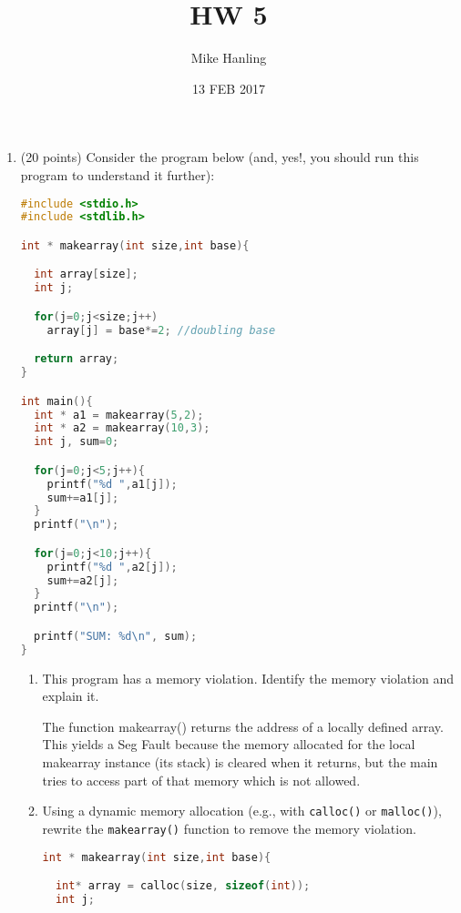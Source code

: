 \documentclass{article}[9pt]
\title{HW 5}
\author{Mike Hanling}
\date{13 FEB 2017}
\newenvironment{answerfont}{\fontfamily{qhv}\selectfont}{\par}
\newenvironment{myanswer}{\begin{mdframed}\begin{answerfont}}{\end{answerfont}\end{mdframed}}
\begin{document}
\maketitle


\begin{enumerate}
\item (20 points) Consider the program below (and, yes!, you should run this program to
understand it further):

\begin{lstlisting}[language=c]
#include <stdio.h>
#include <stdlib.h>

int * makearray(int size,int base){

  int array[size];
  int j;

  for(j=0;j<size;j++)
    array[j] = base*=2; //doubling base

  return array;
}

int main(){
  int * a1 = makearray(5,2);
  int * a2 = makearray(10,3);
  int j, sum=0;

  for(j=0;j<5;j++){
    printf("%d ",a1[j]);
    sum+=a1[j];
  }
  printf("\n");

  for(j=0;j<10;j++){
    printf("%d ",a2[j]);
    sum+=a2[j];
  }
  printf("\n");

  printf("SUM: %d\n", sum);
}
\end{lstlisting}


\begin{enumerate}
\item This program has a memory violation. Identify the memory violation and explain it.

\begin{myanswer}
The function makearray() returns the address of a locally defined
array.\\
This yields a Seg Fault because the memory allocated for the local
makearray instance (its stack) is cleared when it returns, but the main tries to
access part of that memory which is not allowed.
\end{myanswer}

\item Using a dynamic memory allocation (e.g., with \texttt{calloc()} or
\texttt{malloc()}), rewrite the \texttt{makearray()} function to remove the
memory violation.

\begin{myanswer}
\begin{lstlisting}[language=c]
int * makearray(int size,int base){

  int* array = calloc(size, sizeof(int));
  int j;


\end{lstlisting}
\end{myanswer}
\end{enumerate}
\end{enumerate}
\end{document}
